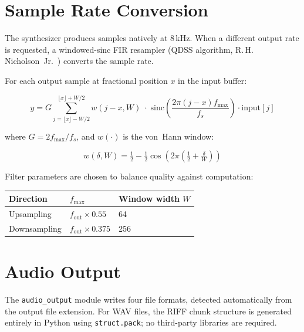 \documentclass[10pt]{article}
\begin{document}
\FloatBarrier
\section{Sample Rate Conversion}
\label{sec:src}

The synthesizer produces samples natively at 8\,kHz.  When a different output
rate is requested, a windowed-sinc FIR resampler (QDSS algorithm, R.\,H.\,Nicholson~Jr.~\cite{Nicholson_QDSS}) converts the sample rate.

For each output sample at fractional position $x$ in the input buffer:

\begin{equation}
y = G \sum_{j=\lfloor x\rfloor - W/2}^{\lfloor x\rfloor + W/2}
    w(j-x,W)\;\cdot\;\mathrm{sinc}\!\left(\frac{2\pi(j-x)f_{\max}}{f_s}\right)
    \cdot \mathrm{input}[j]
\label{eq:qdss}
\end{equation}

where $G = 2f_{\max}/f_s$, and $w(\cdot)$ is the von~Hann window:

\begin{equation}
w(\delta, W) = \tfrac{1}{2} - \tfrac{1}{2}
  \cos\!\left(2\pi\!\left(\tfrac{1}{2} + \tfrac{\delta}{W}\right)\right)
\label{eq:hann}
\end{equation}

Filter parameters are chosen to balance quality against computation:

\begin{center}
\begin{tabular}{lll}
\toprule
Direction    & $f_{\max}$            & Window width $W$ \\
\midrule
Upsampling   & $f_{\mathrm{out}} \times 0.55$  & 64   \\
Downsampling & $f_{\mathrm{out}} \times 0.375$ & 256  \\
\bottomrule
\end{tabular}
\end{center}

\section{Audio Output}
\label{sec:audio}

The \texttt{audio\_output} module writes four file formats, detected
automatically from the output file extension.  For WAV files, the RIFF chunk
structure is generated entirely in Python using \texttt{struct.pack}; no
third-party libraries are required.
\end{document}
